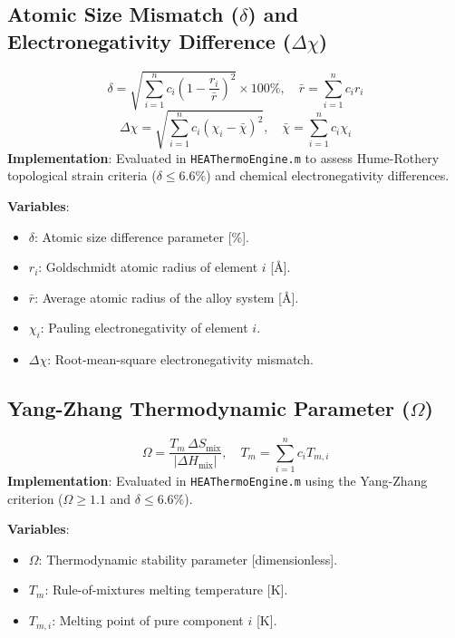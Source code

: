 \documentclass[11pt,a4paper]{article}
\begin{document}
\subsection{Atomic Size Mismatch ($\delta$) and Electronegativity Difference ($\Delta\chi$)}
\begin{equation}
\delta = \sqrt{\sum_{i=1}^n c_i \left(1 - \frac{r_i}{\bar{r}}\right)^2} \times 100\%, \quad \bar{r} = \sum_{i=1}^n c_i r_i
\end{equation}
\begin{equation}
\Delta\chi = \sqrt{\sum_{i=1}^n c_i \left(\chi_i - \bar{\chi}\right)^2}, \quad \bar{\chi} = \sum_{i=1}^n c_i \chi_i
\end{equation}
\textbf{Implementation}: Evaluated in \texttt{HEAThermoEngine.m} to assess Hume-Rothery topological strain criteria ($\delta \le 6.6\%$) and chemical electronegativity differences.

\noindent\textbf{Variables}:
\begin{itemize}
  \item $\delta$: Atomic size difference parameter [$\%$].
  \item $r_i$: Goldschmidt atomic radius of element $i$ [$\text{\AA}$].
  \item $\bar{r}$: Average atomic radius of the alloy system [$\text{\AA}$].
  \item $\chi_i$: Pauling electronegativity of element $i$.
  \item $\Delta\chi$: Root-mean-square electronegativity mismatch.
\end{itemize}

\subsection{Yang-Zhang Thermodynamic Parameter ($\Omega$)}
\begin{equation}
\Omega = \frac{T_m \, \Delta S_{\text{mix}}}{|\Delta H_{\text{mix}}|}, \quad T_m = \sum_{i=1}^n c_i T_{m,i}
\end{equation}
\textbf{Implementation}: Evaluated in \texttt{HEAThermoEngine.m} using the Yang-Zhang criterion ($\Omega \ge 1.1$ and $\delta \le 6.6\%$).

\noindent\textbf{Variables}:
\begin{itemize}
  \item $\Omega$: Thermodynamic stability parameter [dimensionless].
  \item $T_m$: Rule-of-mixtures melting temperature [$\text{K}$].
  \item $T_{m,i}$: Melting point of pure component $i$ [$\text{K}$].
\end{itemize}
\end{document}
